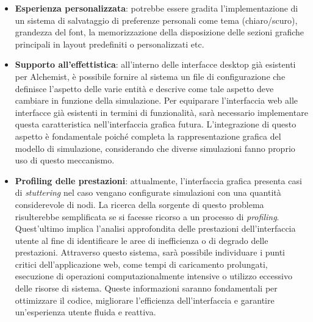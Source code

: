 \begin{itemize}
	\item \textbf{Esperienza personalizzata}: potrebbe essere gradita l'implementazione di un sistema di salvataggio di preferenze personali come tema (chiaro/scuro), grandezza del font, la memorizzazione della disposizione delle sezioni grafiche principali in layout predefiniti o personalizzati etc.
	\item \textbf{Supporto all'effettistica}: all'interno delle interfacce desktop già esistenti per Alchemist, è possibile fornire al sistema un file di configurazione che definisce l'aspetto delle varie entità e descrive come tale aspetto deve cambiare in funzione della simulazione. Per equiparare l'interfaccia web alle interfacce già esistenti in termini di funzionalità, sarà necessario implementare questa caratteristica nell'interfaccia grafica futura. L'integrazione di questo aspetto è fondamentale poiché completa la rappresentazione grafica del modello di simulazione, considerando che diverse simulazioni fanno proprio uso di questo meccanismo.
	\item \textbf{Profiling delle prestazioni}: attualmente, l'interfaccia grafica presenta casi di \textit{stuttering} nel caso vengano configurate simulazioni con una quantità considerevole di nodi. La ricerca della sorgente di questo problema risulterebbe semplificata se si facesse ricorso a un processo di \textit{profiling}. Quest'ultimo implica l'analisi approfondita delle prestazioni dell'interfaccia utente al fine di identificare le aree di inefficienza o di degrado delle prestazioni. Attraverso questo sistema, sarà possibile individuare i punti critici dell'applicazione web, come tempi di caricamento prolungati, esecuzione di operazioni computazionalmente intensive o utilizzo eccessivo delle risorse di sistema. Queste informazioni saranno fondamentali per ottimizzare il codice, migliorare l'efficienza dell'interfaccia e garantire un'esperienza utente fluida e reattiva.
\end{itemize}